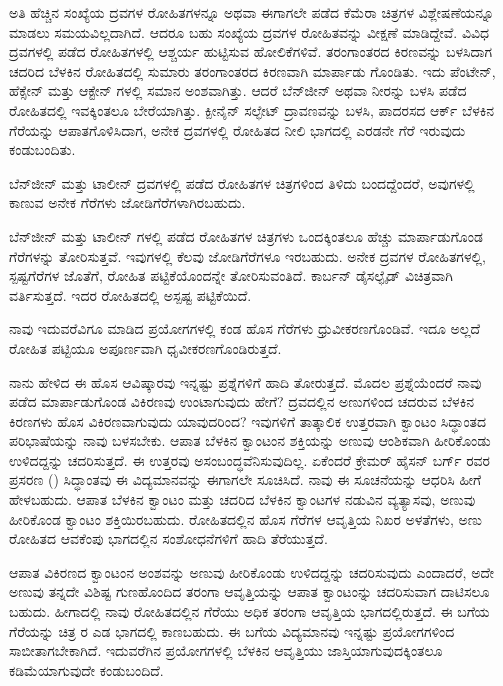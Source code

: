ಅತಿ ಹೆಚ್ಚಿನ ಸಂಖ್ಯೆಯ ದ್ರವಗಳ ರೋಹಿತಗಳನ್ನೂ ಅಥವಾ ಈಗಾಗಲೇ ಪಡೆದ ಕೆಮೆರಾ ಚಿತ್ರಗಳ ವಿಶ್ಲೇಷಣೆಯನ್ನೂ ಮಾಡಲು ಸಮಯವಿಲ್ಲದಾಗಿದೆ. ಆದರೂ ಬಹು ಸಂಖ್ಯೆಯ ದ್ರವಗಳ ರೋಹಿತವನ್ನು ವೀಕ್ಷಣೆ ಮಾಡಿದ್ದೇವೆ. ವಿವಿಧ ದ್ರವಗಳಲ್ಲಿ ಪಡೆದ ರೋಹಿತಗಳಲ್ಲಿ ಆಶ್ಚರ್ಯ ಹುಟ್ಟಿಸುವ ಹೋಲಿಕೆಗಳಿವೆ.  ತರಂಗಾಂತರದ ಕಿರಣವನ್ನು ಬಳಸಿದಾಗ ಚದರಿದ ಬೆಳಕಿನ ರೋಹಿತದಲ್ಲಿ ಸುಮಾರು  ತರಂಗಾಂತರದ ಕಿರಣವಾಗಿ ಮಾರ್ಪಾಡು ಗೊಂಡಿತು. ಇದು ಪೆಂಟೇನ್, ಹೆಕ್ಸೇನ್ ಮತ್ತು ಆಕ್ಟೇನ್ ಗಳಲ್ಲಿ ಸಮಾನ ಅಂಶವಾಗಿತ್ತು. ಆದರೆ ಬೆನ್‍ಜೀನ್ ಅಥವಾ ನೀರನ್ನು ಬಳಸಿ ಪಡೆದ ರೋಹಿತದಲ್ಲಿ ಇವಕ್ಕಿಂತಲೂ ಬೇರೆಯಾಗಿತ್ತು. ಕ್ಪೀನೈನ್ ಸಲ್ಫೇಟ್ ದ್ರಾವಣವನ್ನು ಬಳಸಿ, ಪಾದರಸದ ಆರ್ಕ್ ಬೆಳಕಿನ  ಗೆರೆಯನ್ನು ಆಪಾತಗೊಳಿಸಿದಾಗ, ಅನೇಕ ದ್ರವಗಳಲ್ಲಿ ರೋಹಿತದ ನೀಲಿ ಭಾಗದಲ್ಲಿ ಎರಡನೇ ಗೆರೆ ಇರುವುದು ಕಂಡುಬಂದಿತು.

ಬೆನ್‍ಜೀನ್ ಮತ್ತು ಟಾಲೀನ್ ದ್ರವಗಳಲ್ಲಿ ಪಡೆದ ರೋಹಿತಗಳ ಚಿತ್ರಗಳಿಂದ ತಿಳಿದು ಬಂದದ್ದೆಂದರೆ, ಅವುಗಳಲ್ಲಿ ಕಾಣುವ ಅನೇಕ ಗೆರೆಗಳು ಜೋಡಿಗೆರೆಗಳಾಗಿರಬಹುದು.

ಬೆನ್‍ಜೀನ್ ಮತ್ತು ಟಾಲೀನ್ ಗಳಲ್ಲಿ ಪಡೆದ ರೋಹಿತಗಳ ಚಿತ್ರಗಳು ಒಂದಕ್ಕಿಂತಲೂ ಹೆಚ್ಚು ಮಾರ್ಪಾಡುಗೊಂಡ ಗೆರೆಗಳನ್ನು ತೋರಿಸುತ್ತವೆ. ಇವುಗಳಲ್ಲಿ ಕೆಲವು ಜೋಡಿಗೆರೆಗಳೂ ಇರಬಹುದು. ಅನೇಕ ದ್ರವಗಳ ರೋಹಿತಗಳಲ್ಲಿ, ಸ್ಪಷ್ಟಗೆರೆಗಳ ಜೊತೆಗೆ, ರೋಹಿತ ಪಟ್ಟಿಕೆಯೊಂದನ್ನೇ ತೋರಿಸುವಂತಿದೆ. ಕಾರ್ಬನ್ ಡೈಸಲ್ಫೈಡ್ ವಿಚಿತ್ರವಾಗಿ ವರ್ತಿಸುತ್ತದೆ. ಇದರ ರೋಹಿತದಲ್ಲಿ ಅಸ್ಪಷ್ಟ ಪಟ್ಟಿಕೆಯಿದೆ.

ನಾವು ಇದುವರೆವಿಗೂ ಮಾಡಿದ ಪ್ರಯೋಗಗಳಲ್ಲಿ ಕಂಡ ಹೊಸ ಗೆರೆಗಳು ಧ್ರುವೀಕರಣಗೊಂಡಿವೆ. ಇದೂ ಅಲ್ಲದೆ ರೋಹಿತ ಪಟ್ಟಿಯೂ ಅಪೂರ್ಣವಾಗಿ ಧೃವೀಕರಣಗೊಂಡಿರುತ್ತದೆ.



ನಾನು ಹೇಳಿದ ಈ ಹೊಸ ಆವಿಷ್ಕಾರವು ಇನ್ನಷ್ಟು ಪ್ರಶ್ನೆಗಳಿಗೆ ಹಾದಿ ತೋರುತ್ತದೆ. ಮೊದಲ ಪ್ರಶ್ನೆಯೆಂದರೆ ನಾವು ಪಡೆದ ಮಾರ್ಪಾಡುಗೊಂಡ ವಿಕಿರಣವು ಉಂಟಾಗುವುದು ಹೇಗೆ? ದ್ರವದಲ್ಲಿನ ಅಣುಗಳಿಂದ ಚದರುವ ಬೆಳಕಿನ ಕಿರಣಗಳು ಹೊಸ ವಿಕಿರಣವಾಗುವುದು ಯಾವುದರಿಂದ? ಇವುಗಳಿಗೆ ತಾತ್ಕಾಲಿಕ ಉತ್ತರವಾಗಿ ಕ್ವಾಂಟಂ ಸಿದ್ಧಾಂತದ ಪರಿಭಾಷೆಯನ್ನು ನಾವು ಬಳಸಬೇಕು. ಆಪಾತ ಬೆಳಕಿನ ಕ್ವಾಂಟಂನ ಶಕ್ತಿಯನ್ನು ಅಣುವು ಆಂಶಿಕವಾಗಿ ಹೀರಿಕೊಂಡು ಉಳಿದದ್ದನ್ನು ಚದರಿಸುತ್ತದೆ. ಈ ಉತ್ತರವು ಅಸಂಬಂದ್ಧವೆನಿಸುವುದಿಲ್ಲ. ಏಕೆಂದರೆ ಕ್ರೇಮರ್\enginline{-} ಹೈಸನ್ ಬರ್ಗ್ ರವರ ಪ್ರಸರಣ () ಸಿದ್ಧಾಂತವು ಈ ವಿದ್ಯಮಾನವನ್ನು ಈಗಾಗಲೇ ಸೂಚಿಸಿದೆ. ನಾವು ಈ ಸೂಚನೆಯನ್ನು ಆಧರಿಸಿ ಹೀಗೆ ಹೇಳಬಹುದು. ಆಪಾತ ಬೆಳಕಿನ ಕ್ವಾಂಟಂ ಮತ್ತು ಚದರಿದ ಬೆಳಕಿನ ಕ್ವಾಂಟಗಳ ನಡುವಿನ ವ್ಯತ್ಯಾಸವು, ಅಣುವು ಹೀರಿಕೊಂಡ ಕ್ವಾಂಟಂ ಶಕ್ತಿಯಿರಬಹುದು. ರೋಹಿತದಲ್ಲಿನ ಹೊಸ ಗೆರೆಗಳ ಆವೃತ್ತಿಯ ನಿಖರ ಅಳತೆಗಳು, ಅಣು ರೋಹಿತದ ಆವಕೆಂಪು ಭಾಗದಲ್ಲಿನ ಸಂಶೋಧನೆಗಳಿಗೆ ಹಾದಿ ತೆರೆಯುತ್ತದೆ.

ಆಪಾತ ವಿಕಿರಣದ ಕ್ವಾಂಟಂನ ಅಂಶವನ್ನು ಅಣುವು ಹೀರಿಕೊಂಡು ಉಳಿದದ್ದನ್ನು ಚದರಿಸುವುದು ಎಂದಾದರೆ, ಅದೇ ಅಣುವು ತನ್ನದೇ ವಿಶಿಷ್ಟ ಗುಣಹೊಂದಿದ ತರಂಗಾ ಆವೃತ್ತಿಯನ್ನು ಆಪಾತ ಕ್ವಾಂಟಂನ್ನು ಚದರಿಸುವಾಗ ದಾಟಿಸಲೂ ಬಹುದು. ಹೀಗಾದಲ್ಲಿ ನಾವು ರೋಹಿತದಲ್ಲಿನ ಗೆರೆಯು ಅಧಿಕ ತರಂಗಾ ಆವೃತ್ತಿಯ ಭಾಗದಲ್ಲಿರುತ್ತದೆ. ಈ ಬಗೆಯ ಗೆರೆಯನ್ನು ಚಿತ್ರ  ರ ಎಡ ಭಾಗದಲ್ಲಿ ಕಾಣಬಹುದು. ಈ ಬಗೆಯ ವಿದ್ಯಮಾನವು ಇನ್ನಷ್ಟು ಪ್ರಯೋಗಗಳಿಂದ ಸಾಬೀತಾಗಬೇಕಾಗಿದೆ. ಇದುವರೆಗಿನ ಪ್ರಯೋಗಗಳಲ್ಲಿ ಬೆಳಕಿನ ಆವೃತ್ತಿಯು ಜಾಸ್ತಿಯಾಗುವುದಕ್ಕಿಂತಲೂ ಕಡಿಮೆಯಾಗುವುದೇ ಕಂಡುಬಂದಿದೆ.

